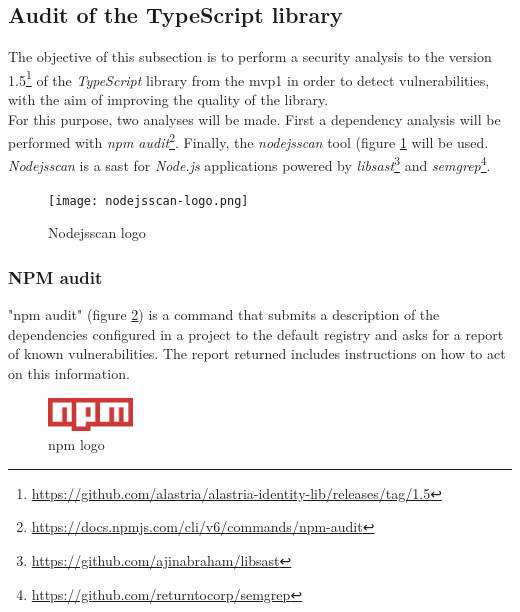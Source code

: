 \subsection{Audit of the TypeScript library}
The objective of this subsection is to perform a security analysis to the version 1.5\footnote{\url{https://github.com/alastria/alastria-identity-lib/releases/tag/1.5}\label{lib-version}} of the \textit{TypeScript} library from the \acrshort{mvp}1 in order to detect vulnerabilities, with the aim of improving the quality of the library.\\

For this purpose, two analyses will be made. First a dependency analysis will be performed with \textit{\acrshort{npm} audit}\footnote{\url{https://docs.npmjs.com/cli/v6/commands/npm-audit}}. Finally, the \textit{nodejsscan} tool (figure \ref{fig:nodejsscan-logo} will be used. \textit{Nodejsscan} is a \acrfull{sast} for \textit{Node.js} applications powered by \textit{libsast}\footnote{\url{https://github.com/ajinabraham/libsast}} and \textit{semgrep}\footnote{\url{https://github.com/returntocorp/semgrep}}.
\begin{figure}[h]
    \centering
    \texttt{[image: nodejsscan-logo.png]}
    \caption{Nodejsscan logo}
    \label{fig:nodejsscan-logo}
\end{figure}

\subsubsection{NPM audit}
"\acrshort{npm} audit" (figure \ref{fig:npmlogo}) is a command that submits a description of the dependencies configured in a project to the default registry and asks for a report of known vulnerabilities. The report returned includes instructions on how to act on this information.\\
\begin{figure}[h]
    \centering
    \includegraphics[width=0.2\textwidth]{images/npmlogo.png}
    \caption{\acrshort{npm} logo}
    \label{fig:npmlogo}
\end{figure}

